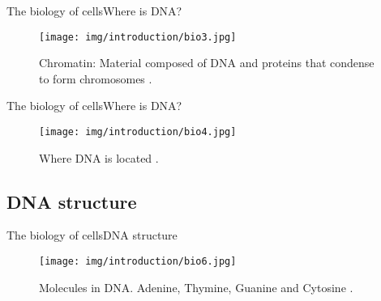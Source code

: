 \documentclass[10pt]{beamer}
\newcommand{\1}{
	\setbeamertemplate{background}{
		\texttt{[image: img/1]}
		\tikz[overlay] \fill[fill opacity=0.75,fill=white] (0,0) rectangle (-\paperwidth,\paperheight);
	}
}
\begin{document}
\begin{frame}{The biology of cells}{Where is DNA?}
\begin{figure}[]
 \centering
    \texttt{[image: img/introduction/bio3.jpg]}
    \label{img:mot2}
    \caption{Chromatin: Material composed of DNA and proteins that condense to form chromosomes \cite{archibald2018genomics}.}
\end{figure}
\end{frame}

\begin{frame}{The biology of cells}{Where is DNA?}
\begin{figure}[]
 \centering
    \texttt{[image: img/introduction/bio4.jpg]}
    \label{img:mot2}
    \caption{Where DNA is located \cite{dna2020located}.}
\end{figure}
\end{frame}

\subsection{DNA structure}

\begin{frame}{The biology of cells}{DNA structure}
\begin{figure}[]
 \centering
    \texttt{[image: img/introduction/bio6.jpg]}
    \label{img:mot2}
    \caption{Molecules in DNA. Adenine, Thymine, Guanine and Cytosine \cite{dna2020located}.}
\end{figure}
\end{frame}
\end{document}
